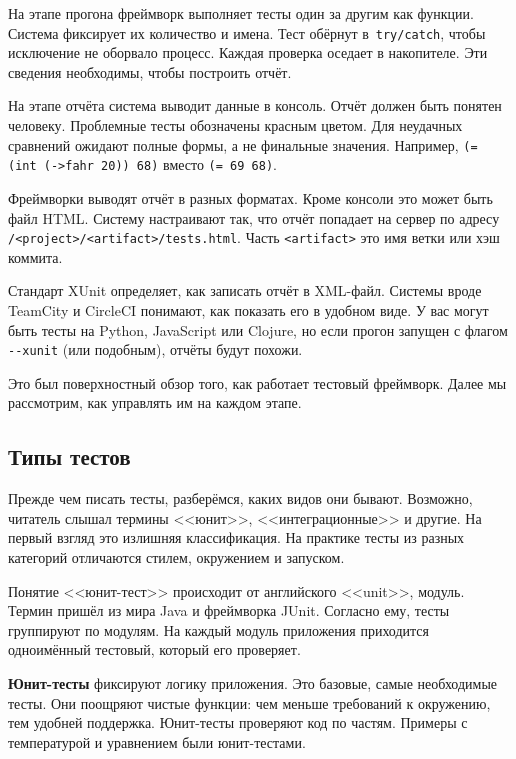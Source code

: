 На этапе прогона фреймворк выполняет тесты один за другим как функции. Система
фиксирует их количество и имена. Тест обёрнут в~\verb|try/catch|, чтобы
исключение не оборвало процесс. Каждая проверка оседает в накопителе. Эти
сведения необходимы, чтобы построить отчёт.

На этапе отчёта система выводит данные в консоль. Отчёт должен быть понятен
человеку. Проблемные тесты обозначены красным цветом. Для неудачных сравнений
ожидают полные формы, а не финальные значения. Например,
\verb|(= (int (->fahr 20)) 68)| вместо \verb|(= 69 68)|.

Фреймворки выводят отчёт в разных форматах. Кроме консоли это может быть файл
HTML. Систему настраивают так, что отчёт попадает на сервер по адресу
\verb|/<project>/<artifact>/tests.html|. Часть \verb|<artifact>| это имя
ветки или хэш коммита.

Стандарт XUnit определяет, как записать отчёт в XML-файл. Системы вроде TeamCity
и CircleCI понимают, как показать его в удобном виде. У вас могут быть тесты на
Python, JavaScript или Clojure, но если прогон запущен с флагом \verb|--xunit|
(или подобным), отчёты будут похожи.

Это был поверхностный обзор того, как работает тестовый фреймворк. Далее мы
рассмотрим, как управлять им на каждом этапе.

\subsection{Типы тестов}


Прежде чем писать тесты, разберёмся, каких видов они бывают. Возможно, читатель
слышал термины <<юнит>>, <<интеграционные>> и другие. На первый взгляд это
излишняя классификация. На практике тесты из разных категорий отличаются стилем,
окружением и запуском.

Понятие <<юнит-тест>> происходит от английского <<unit>>, модуль. Термин пришёл
из мира Java и фреймворка JUnit. Согласно ему, тесты группируют по модулям. На
каждый модуль приложения приходится одноимённый тестовый, который его проверяет.

\textbf{Юнит-тесты} фиксируют логику приложения. Это базовые, самые необходимые
тесты. Они поощряют чистые функции: чем меньше требований к окружению, тем
удобней поддержка. Юнит-тесты проверяют код по частям. Примеры с температурой и
уравнением были юнит-тестами.


